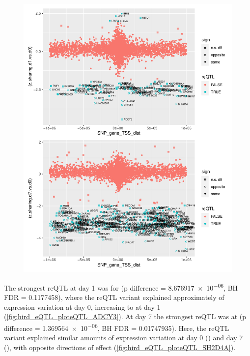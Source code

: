 \begin{figure}
    \centering
    \includegraphics[width=1.0\textwidth]{mainmatter/figures/chapter_03/compare_dge_eqtl.z_sharing.vs.SNP_gene_TSS_dist.pdf}
    \caption{}
    \label{fig:hird_eQTL_zSharing_vs_TSSdist_mega}
\end{figure}

The strongest reQTL at day 1 was for  (p difference = \num{8.676917e-06}, BH FDR = \num{0.1177458}),
where the \gls{reQTL} variant explained approximately  of expression variation at day 0, increasing to  at day 1 (\autoref{fig:hird_eQTL_ploteQTL_ADCY3}).
At day 7 the strongest \gls{reQTL} was at  (p difference = \num{1.369564e-06}, BH FDR = \num{0.01747935}).
Here, the \gls{reQTL} variant explained similar amounts of expression variation at day 0 () and day 7 (), with opposite directions of effect (\autoref{fig:hird_eQTL_ploteQTL_SH2D4A}).

